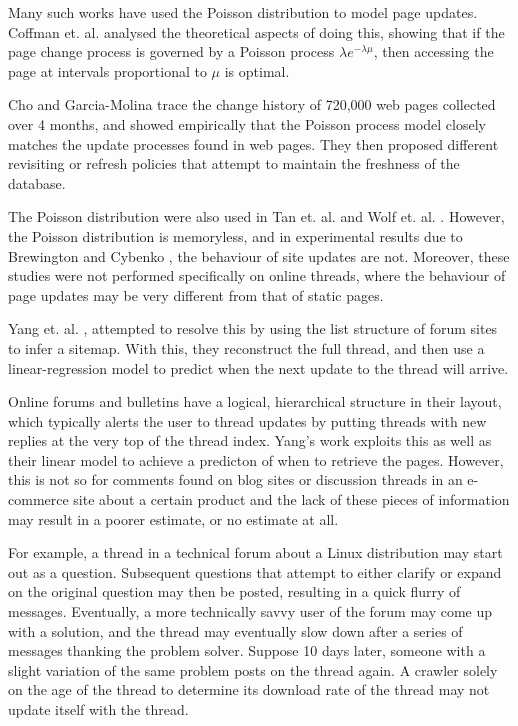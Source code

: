 \documentclass[12 pt]{article}
\begin{document}
Many such works have used the Poisson distribution to model page updates. Coffman et. al. \cite{Coffman1997} analysed the theoretical aspects of doing this, showing that if the page change process is governed by a Poisson process $\lambda e^{-\lambda \mu}$, then accessing the page at intervals proportional to $\mu$ is optimal.

Cho and Garcia-Molina trace the change history of 720,000 web pages collected over 4 months, and showed empirically that the Poisson process model closely matches the update processes found in web pages\cite{Cho1999}. They then proposed different revisiting or refresh policies \cite{Cho2003,Garcia-molina2003} that attempt to maintain the freshness of the database.


The Poisson distribution were also used in Tan et. al. \cite{Tan2007} and Wolf et. al. \cite{Wolf2002}. %
However, the Poisson distribution is memoryless, and in experimental results due to Brewington and Cybenko \cite{Brian2000}, the behaviour of site updates are not. Moreover, these studies were not performed specifically on online threads, where the behaviour of page updates may be very different from that of static pages.

Yang et. al. \cite{Yang2009}, attempted to resolve this by using the list structure of forum sites to infer a sitemap. With this, they reconstruct the full thread, and then use a linear-regression model to predict when the next update to the thread will arrive. %

Online forums and bulletins have a logical, hierarchical structure in their layout, which typically alerts the user to thread updates by putting threads with new replies at the very top of the thread index. Yang's work exploits this as well as their linear model to achieve a predicton of when to retrieve the pages.
However, this is not so for comments found on blog sites or discussion threads in an e-commerce site about a certain product and the lack of these pieces of information may result in a poorer estimate, or no estimate at all.

For example, a thread in a technical forum about a Linux distribution may start out as a question. Subsequent questions that attempt to either clarify or expand on the original question may then be posted, resulting in a quick flurry of messages. Eventually, a more technically savvy user of the forum may come up with a solution, and the thread may eventually slow down after a series of messages thanking the problem solver. Suppose 10 days later, someone with a slight variation of the same problem posts on the thread again. A crawler solely on the age of the thread to determine its download rate of the thread may not update itself with the thread.
\end{document}
